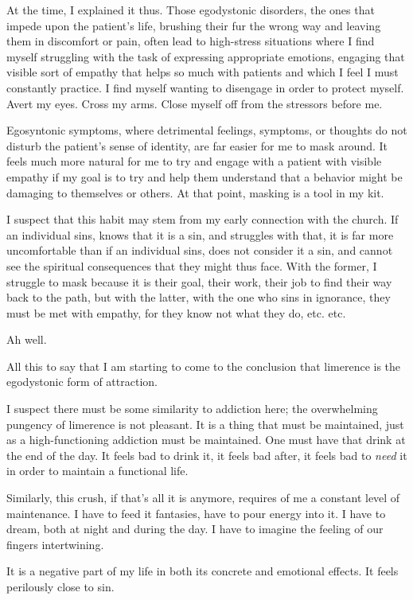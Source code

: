 At the time, I explained it thus. Those egodystonic disorders, the ones that impede upon the patient's life, brushing their fur the wrong way and leaving them in discomfort or pain, often lead to high-stress situations where I find myself struggling with the task of expressing appropriate emotions, engaging that visible sort of empathy that helps so much with patients and which I feel I must constantly practice. I find myself wanting to disengage in order to protect myself. Avert my eyes. Cross my arms. Close myself off from the stressors before me.

Egosyntonic symptoms, where detrimental feelings, symptoms, or thoughts do not disturb the patient's sense of identity, are far easier for me to mask around. It feels much more natural for me to try and engage with a patient with visible empathy if my goal is to try and help them understand that a behavior might be damaging to themselves or others. At that point, masking is a tool in my kit.

I suspect that this habit may stem from my early connection with the church. If an individual sins, knows that it is a sin, and struggles with that, it is far more uncomfortable than if an individual sins, does not consider it a sin, and cannot see the spiritual consequences that they might thus face. With the former, I struggle to mask because it is their goal, their work, their job to find their way back to the path, but with the latter, with the one who sins in ignorance, they must be met with empathy, for they know not what they do, etc. etc.

Ah well.

All this to say that I am starting to come to the conclusion that limerence is the egodystonic form of attraction.

I suspect there must be some similarity to addiction here; the overwhelming pungency of limerence is not pleasant. It is a thing that must be maintained, just as a high-functioning addiction must be maintained. One must have that drink at the end of the day. It feels bad to drink it, it feels bad after, it feels bad to \emph{need} it in order to maintain a functional life.

Similarly, this crush, if that's all it is anymore, requires of me a constant level of maintenance. I have to feed it fantasies, have to pour energy into it. I have to dream, both at night and during the day. I have to imagine the feeling of our fingers intertwining.

It is a negative part of my life in both its concrete and emotional effects. It feels perilously close to sin.

